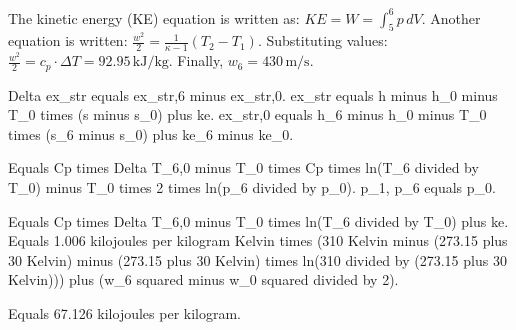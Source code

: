 The kinetic energy (KE) equation is written as:  
\( KE = W = \int_{5}^{6} p \, dV \).  
Another equation is written:  
\( \frac{w^2}{2} = \frac{1}{\kappa - 1} (T_2 - T_1) \).  
Substituting values:  
\( \frac{w^2}{2} = c_p \cdot \Delta T = 92.95 \, \text{kJ/kg} \).  
Finally, \( w_6 = 430 \, \text{m/s} \).

Delta ex_str equals ex_str,6 minus ex_str,0.  
ex_str equals h minus h_0 minus T_0 times (s minus s_0) plus ke.  
ex_str,0 equals h_6 minus h_0 minus T_0 times (s_6 minus s_0) plus ke_6 minus ke_0.  

Equals Cp times Delta T_6,0 minus T_0 times Cp times ln(T_6 divided by T_0) minus T_0 times 2 times ln(p_6 divided by p_0).  
p_1, p_6 equals p_0.  

Equals Cp times Delta T_6,0 minus T_0 times ln(T_6 divided by T_0) plus ke.  
Equals 1.006 kilojoules per kilogram Kelvin times (310 Kelvin minus (273.15 plus 30 Kelvin) minus (273.15 plus 30 Kelvin) times ln(310 divided by (273.15 plus 30 Kelvin))) plus (w_6 squared minus w_0 squared divided by 2).  

Equals 67.126 kilojoules per kilogram.